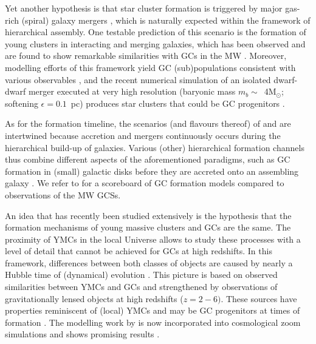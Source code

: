 \documentclass[a4paper,fleqn,usenatbib]{mnras}
\newcommand{\Sun}[0]{\ensuremath{_{\odot}}}
\begin{document}
Yet another hypothesis is that star cluster formation is triggered by major 
gas-rich (spiral) galaxy mergers \citep{1987nngp.proc...18S, 1992ApJ...384...50A},
which is naturally expected within the framework of hierarchical assembly. One
testable prediction of this scenario is the formation of young clusters in
interacting and merging galaxies, which has been observed and are found to show 
remarkable similarities with GCs in the MW \citep[e.g.][]{
1995AJ....109..960W, 1996AJ....112..416H, 1999AJ....118..752Z, 1999AJ....118.1551W}.
Moreover, modelling efforts of this framework yield GC (sub)populations consistent 
with various observables \citep[e.g.][]{2010ApJ...718.1266M, 2018MNRAS.480.2343C}, 
and the recent numerical simulation of an isolated dwarf-dwarf merger executed at 
very high resolution (baryonic mass $m_b \sim$~4M\Sun; softening $\epsilon = 0.1$~pc) 
produces star clusters that could be GC progenitors \citep{
2019arXiv190509840L}.

As for the formation timeline, the scenarios (and flavours thereof) of \citet{
1985ApJ...298...18F} and \citet{1992ApJ...384...50A} are intertwined because
accretion and mergers continuously occurs during the hierarchical build-up of
galaxies. Various (other) hierarchical formation channels thus combine different
aspects of the aforementioned paradigms, such as GC formation in (small) galactic
disks before they are accreted onto an assembling galaxy \citep[e.g.][]{
2000ApJ...533..869C, 2002ApJ...567..853C, 2002MNRAS.333..383B, 2003egcs.conf..224G}. 
We refer to \citet{2001astro.ph..8034G} for a scoreboard of GC formation models 
compared to observations of the MW GCSs.

An idea that has recently been studied extensively is the hypothesis that the formation
mechanisms of young massive clusters \citep[YMCs, see][for a review]{2010ARA&A..48..431P} 
and GCs are the same. The proximity of YMCs in the local Universe allows to study these 
processes with a level of detail that cannot be achieved for GCs at high redshifts. In 
this framework, differences between both classes of objects are caused by nearly a 
Hubble time of (dynamical) evolution \citep[e.g.][]{1987degc.book.....S}. This picture 
is based on observed similarities between YMCs and GCs
\citep[e.g.][]{1992AJ....103..691H,1999AJ....118.1551W} and strengthened by observations
of gravitationally lensed objects at high redshifts ($z = 2-6)$. These sources have 
properties reminiscent of (local) YMCs and may be GC progenitors at times of formation 
\citep{2017MNRAS.467.4304V,2017ApJ...843L..21J}. The modelling work by 
\citet{2011MNRAS.414.1339K,2012MNRAS.421.1927K,2015MNRAS.454.1658K} is now 
incorporated into cosmological zoom simulations and shows promising results
\citep{2018MNRAS.475.4309P,2019MNRAS.486.3134K}.
\end{document}
